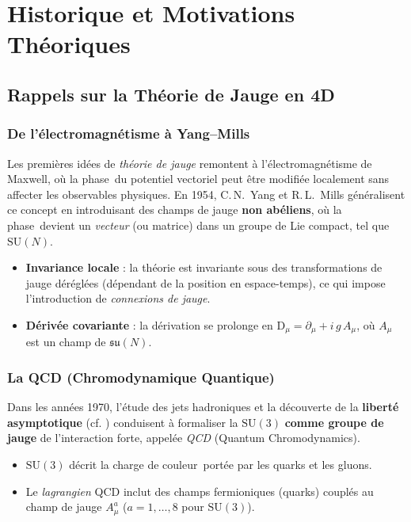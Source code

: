 \chapter{Historique et Motivations Théoriques}
\label{chap:2}

\section{Rappels sur la Théorie de Jauge en 4D}
\label{sec:2.1}

\subsection*{De l'électromagnétisme à Yang--Mills}
Les premières idées de \emph{théorie de jauge} remontent à l'\'electromagnétisme de Maxwell, où la \og phase\fg\ du potentiel vectoriel peut être modifiée localement sans affecter les observables physiques. En 1954, C.\,N.~Yang et R.\,L.~Mills \cite{YangMills1954} généralisent ce concept en introduisant des champs de jauge \textbf{non abéliens}, où la \og phase\fg\ devient un \emph{vecteur} (ou matrice) dans un groupe de Lie compact, tel que \(\mathrm{SU}(N)\).

\begin{itemize}
	\item \textbf{Invariance locale} : la théorie est invariante sous des transformations de jauge déréglées (dépendant de la position en espace-temps), ce qui impose l'introduction de \emph{connexions de jauge}.
	\item \textbf{Dérivée covariante} : la dérivation se prolonge en \(\mathrm{D}_\mu = \partial_\mu + i\,g\,A_\mu\), où \(A_\mu\) est un champ de \(\mathfrak{su}(N)\).
\end{itemize}

\subsection*{La QCD (Chromodynamique Quantique)}
Dans les années 1970, l'étude des jets hadroniques et la découverte de la \textbf{liberté asymptotique} (cf. \cite{GrossWilczek1973,Politzer1973}) conduisent à formaliser la \(\mathrm{SU}(3)\) \textbf{comme groupe de jauge} de l'interaction forte, appelée \emph{QCD} (Quantum Chromodynamics).  
\begin{itemize}
	\item \(\mathrm{SU}(3)\) décrit la charge de \og couleur\fg\ portée par les quarks et les gluons.  
	\item Le \emph{lagrangien} QCD inclut des champs fermioniques (quarks) couplés au champ de jauge \(A_\mu^a\) (\(a=1,\dots,8\) pour \(\mathrm{SU}(3)\)).
\end{itemize}

